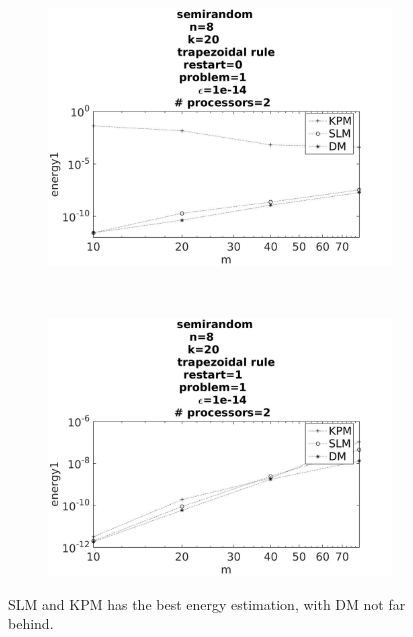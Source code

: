 \begin{figure}[H]
        \centering
        \begin{subfigure}[b]{0.45\textwidth}
                \includegraphics[width=\textwidth]{../MATLAB/fig/vsresultenergyr.jpg}
                \caption{  }
                \label{fig:vsresultenergy1}
        \end{subfigure}
        ~
        \begin{subfigure}[b]{0.45\textwidth}
                \includegraphics[width=\textwidth]{../MATLAB/fig/vsresultenergy.jpg}
                \caption{  }
                \label{fig:vsresultenergy2}
        \end{subfigure}
        \caption{ SLM and KPM has the best energy estimation, with DM not far behind. }
        \label{fig:vsresultenergy}
\end{figure}